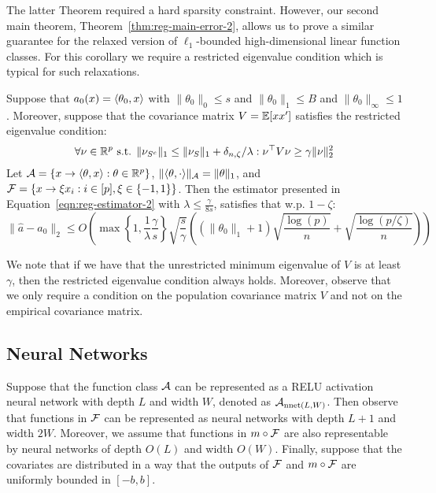 The latter Theorem required a hard sparsity constraint. However, our second main theorem, Theorem~\ref{thm:reg-main-error-2}, allows us to prove a similar guarantee for the relaxed version of $\ell_1$-bounded high-dimensional linear function classes. For this corollary we require a restricted eigenvalue condition which is typical for such relaxations. 

\begin{corollary}\label{cor:sparse-linear-reg-ell1}
Suppose that $a_0(x)=\langle \theta_0, x \rangle$ with $\|\theta_0\|_0\leq s$ and $\|\theta_0\|_1\leq B$ and $\|\theta_0\|_{\infty}\leq 1$. Moreover, suppose that the covariance matrix $V=\mathbb{E}[xx']$ satisfies the restricted eigenvalue condition:
\begin{equation}
    \forall \nu\in \mathbb{R}^p \text{ s.t. } \|\nu_{S^c}\|_1 \leq \|\nu_S\|_1 + \delta_{n,\zeta}/\lambda: \nu^\top  V\nu \geq \gamma \|\nu\|_2^2
\end{equation}
Let ${\mathcal A} = \{x\to \langle \theta, x \rangle: \theta \in \mathbb{R}^p\}$, $\|\langle \theta, \cdot \rangle\|_{{\mathcal A}}=\|\theta\|_1$, and ${\mathcal F}=\{x \to  \xi x_i: i\in [p], \xi\in \{-1, 1\}\}$. Then the estimator presented in Equation~\eqref{eqn:reg-estimator-2} with $\lambda\leq \frac{\gamma}{8s}$, satisfies that w.p. $1-\zeta$:
\begin{equation}
    \textstyle{\|\hat{a}-a_0\|_2 \leq O\left( \max\left\{1, \frac{1}{\lambda}\frac{\gamma}{s}\right\} \sqrt{\frac{s}{\gamma}} \left((\|\theta_0\|_1 + 1)\sqrt{\frac{\log(p)}{n}} + \sqrt{\frac{\log(p/\zeta)}{n}}\right)\right)}
\end{equation}
\end{corollary}


\begin{remark}
We note that if we have that the unrestricted minimum eigenvalue of $V$ is at least $\gamma$, then the restricted eigenvalue condition always holds. Moreover, observe that we only require a condition on the population covariance matrix $V$ and not on the empirical covariance matrix.
\end{remark}

\subsection{Neural Networks}

Suppose that the function class ${\mathcal A}$ can be represented as a RELU activation neural network with depth $L$ and width $W$, denoted as ${\mathcal A}_{\text{nnet}(L,W)}$. Then observe that functions in ${\mathcal F}$ can be represented as neural networks with depth $L+1$ and width $2W$. Moreover, we assume that functions in $m\circ {\mathcal F}$ are also representable by neural networks of depth $O(L)$ and width $O(W)$. Finally, suppose that the covariates are distributed in a way that the outputs of ${\mathcal F}$ and $m\circ{\mathcal F}$ are uniformly bounded in $[-b,b]$. 

